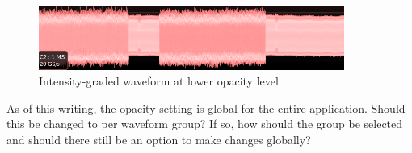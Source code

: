 \begin{figure}[H]
\centering
\includegraphics[width=10cm]{images/graded-waveform.png}
\caption{Intensity-graded waveform at lower opacity level}
\label{graded-waveform}
\end{figure}

As of this writing, the opacity setting is global for the entire application. Should this be changed to per waveform
group? If so, how should the group be selected and should there still be an option to make changes globally?
